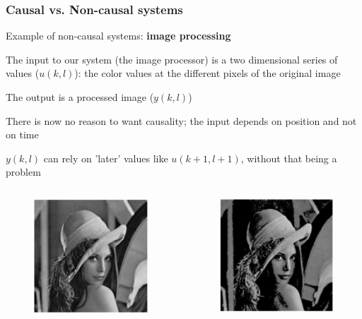 \documentclass{beamer}
\begin{document}
\begin{frame}
\frametitle{Causal vs. Non-causal systems}
Example of non-causal systems: \textbf{image processing}\\
\begin{itemize}
\small{
\item The input to our system (the image processor) is a two dimensional series of values ($u(k,l)$): the color values at the different pixels of the original image
\item The output is a processed image ($y(k,l)$)
\item There is now no reason to want causality; the input depends on position and not on time
\item $y(k,l)$ can rely on 'later' values like $u(k+1,l+1)$, without that being a problem}
\end{itemize}
\vspace{-2ex}
\begin{columns}
\begin{figure}
\includegraphics[width=.5\linewidth]{original}
\end{figure}
\vspace{-4ex}

\begin{figure}
\includegraphics[width=.5\linewidth]{removed}
\end{figure}
\vspace{-4ex}


\end{columns}
\end{frame}
\end{document}
